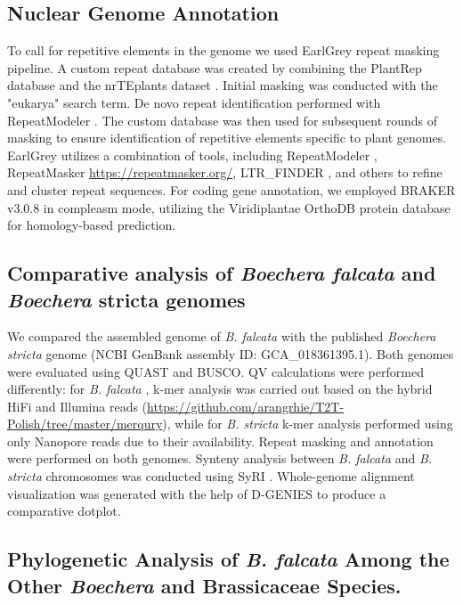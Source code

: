 \documentclass[9pt,twocolumn,twoside,lineno]{gsag3jnl}
\begin{document}
\subsection{Nuclear Genome Annotation}

To call for repetitive elements in the genome we used EarlGrey \citep{baril2024earl} repeat masking pipeline. A custom repeat database was created by combining the PlantRep database \citep{luo2022} and the nrTEplants dataset \citep{contreras2021k}. Initial masking was conducted with the "eukarya" search term. De novo repeat identification performed with RepeatModeler \citep{flynn2020repeatmodeler2}. The custom database was then used for subsequent rounds of masking to ensure identification of repetitive elements specific to plant genomes. EarlGrey utilizes a combination of tools, including RepeatModeler \citep{flynn2020repeatmodeler2}, RepeatMasker
\url{https://repeatmasker.org/}, LTR\_FINDER \citep{xu2007}, and others to refine and cluster repeat sequences.
For coding gene annotation, we employed BRAKER v3.0.8 \citep{gabriel2024braker3} in compleasm \citep{huang2023} mode, utilizing the Viridiplantae OrthoDB \citep{kriventseva2019} protein database for homology-based prediction.

\subsection{Comparative analysis of \textit{Boechera falcata} and \textit{Boechera} stricta genomes}

We compared the assembled genome of \textit{B. falcata} with the published \textit{Boechera stricta} genome (NCBI GenBank assembly ID: GCA\_018361395.1). Both genomes were evaluated using QUAST and BUSCO. QV calculations were performed differently: for \textit{B. falcata} , k-mer analysis was carried out based on the hybrid HiFi and Illumina reads (\url{https://github.com/arangrhie/T2T-Polish/tree/master/merqury}), while for \textit{B. stricta} k-mer analysis performed using only Nanopore reads due to their availability. Repeat masking and annotation were performed on both genomes. Synteny analysis between \textit{B. falcata} and \textit{B. stricta} chromosomes was conducted using SyRI \citep{goel2019syri}. Whole-genome alignment visualization was generated with the help of D-GENIES \citep{cabanettes2018} to produce a comparative dotplot.

\subsection{Phylogenetic Analysis of \textit{B. falcata} Among the Other \textit{Boechera} and Brassicaceae Species.}
\end{document}

